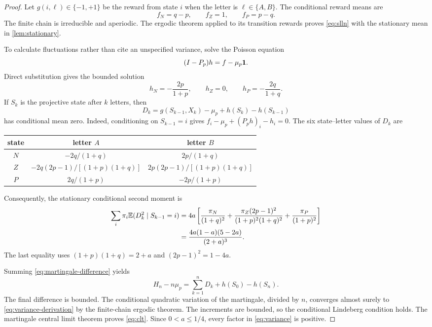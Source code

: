 \begin{proof}
Let $g(i,\ell)\in\{-1,+1\}$ be the reward from state $i$ when the letter is
$\ell\in\{A,B\}$.  The conditional reward means are
\[
 f_N=q-p,\qquad f_Z=1,\qquad f_P=p-q.
\]
The finite chain is irreducible and aperiodic.  The ergodic theorem applied
to its transition rewards proves \eqref{eq:slln} with the stationary mean in
\cref{lem:stationary}.

To calculate fluctuations rather than cite an unspecified variance, solve
the Poisson equation
\[
 (I-P_p)h=f-\mu_p\mathbf{1}.
\]
Direct substitution gives the bounded solution
\begin{equation}
 \label{eq:poisson-solution}
 h_N=-\frac{2p}{1+p},\qquad h_Z=0,
 \qquad h_P=-\frac{2q}{1+q}.
\end{equation}
If $S_k$ is the projective state after $k$ letters, then
\begin{equation}
 \label{eq:martingale-difference}
 D_k=g(S_{k-1},X_k)-\mu_p+h(S_k)-h(S_{k-1})
\end{equation}
has conditional mean zero.  Indeed, conditioning on $S_{k-1}=i$ gives
$f_i-\mu_p+(P_ph)_i-h_i=0$.  The six state--letter values of $D_k$ are
\begin{center}
\renewcommand{\arraystretch}{1.13}
\begin{tabular}{c@{\qquad}cc}
\toprule
state & letter $A$ & letter $B$\\
\midrule
$N$ & $-2q/(1+q)$ & $2p/(1+q)$\\
$Z$ & $-2q(2p-1)/[(1+p)(1+q)]$
    & $2p(2p-1)/[(1+p)(1+q)]$\\
$P$ & $2q/(1+p)$ & $-2p/(1+p)$\\
\bottomrule
\end{tabular}
\end{center}
Consequently, the stationary conditional second moment is
\begin{align}
 \sum_i\pi_i\mathbb{E}(D_k^2\mid S_{k-1}=i)
 &=4a\left[
 \frac{\pi_N}{(1+q)^2}
 +\frac{\pi_Z(2p-1)^2}{(1+p)^2(1+q)^2}
 +\frac{\pi_P}{(1+p)^2}\right] \notag\\
 &=\frac{4a(1-a)(5-2a)}{(2+a)^3}.
 \label{eq:variance-derivation}
\end{align}
The last equality uses $(1+p)(1+q)=2+a$ and
$(2p-1)^2=1-4a$.

Summing \eqref{eq:martingale-difference} yields
\[
 H_n-n\mu_p=\sum_{k=1}^nD_k+h(S_0)-h(S_n).
\]
The final difference is bounded.  The conditional quadratic variation of
the martingale, divided by $n$, converges almost surely to
\eqref{eq:variance-derivation} by the finite-chain ergodic theorem.
The increments are bounded, so the conditional Lindeberg condition holds.
The martingale central limit theorem
\cite[Theorem~3.2]{HallHeyde1980} proves \eqref{eq:clt}.  Since
$0<a\leq1/4$, every factor in \eqref{eq:variance} is positive.
\end{proof}

